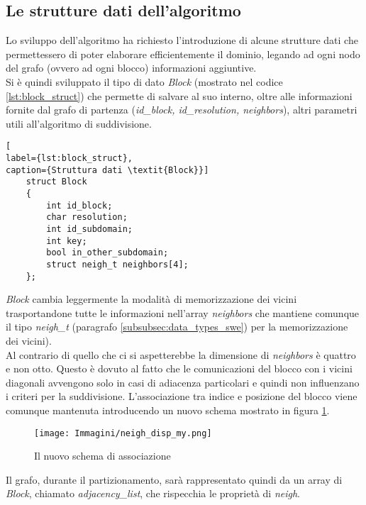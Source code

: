 \subsection{Le strutture dati dell'algoritmo}
Lo sviluppo dell'algoritmo ha richiesto l'introduzione di alcune strutture dati che permettessero di poter elaborare efficientemente il dominio, legando ad ogni nodo del grafo (ovvero ad ogni blocco) informazioni aggiuntive.\\
Si è quindi sviluppato il tipo di dato \emph{Block} (mostrato nel codice \ref{lst:block_struct}) che permette di salvare al suo interno, oltre alle informazioni fornite dal grafo di partenza (\textit{id\_block, id\_resolution, neighbors}), altri parametri utili all'algoritmo di suddivisione.\\
\begin{lstlisting}[ 
label={lst:block_struct},
caption={Struttura dati \textit{Block}}]
	struct Block
	{
		int id_block;
		char resolution;
		int id_subdomain;
		int key;
		bool in_other_subdomain;
		struct neigh_t neighbors[4];
	};
\end{lstlisting}
\textit{Block} cambia leggermente la modalità di memorizzazione dei vicini trasportandone tutte le informazioni nell'array \textit{neighbors} che mantiene comunque il tipo \textit{neigh\_t} (paragrafo \ref{subsubsec:data_types_swe}) per la memorizzazione dei vicini).\\
Al contrario di quello che ci si aspetterebbe la dimensione di \textit{neighbors} è quattro e non otto. Questo è dovuto al fatto che le comunicazioni del blocco con i vicini diagonali avvengono solo in casi di adiacenza particolari e quindi non influenzano i criteri per la suddivisione. L'associazione tra indice e posizione del blocco viene comunque mantenuta introducendo un nuovo schema mostrato in figura \ref{fig:new_scheme_neigh}.\\
\begin{figure}[H]
	\centering
	\texttt{[image: Immagini/neigh\_disp\_my.png]}
	\caption{Il nuovo schema di associazione}
	\label{fig:new_scheme_neigh}
\end{figure}

Il grafo, durante il partizionamento, sarà rappresentato quindi da un array di \textit{Block}, chiamato \emph{adjacency\_list}, che rispecchia le proprietà di \textit{neigh}.

